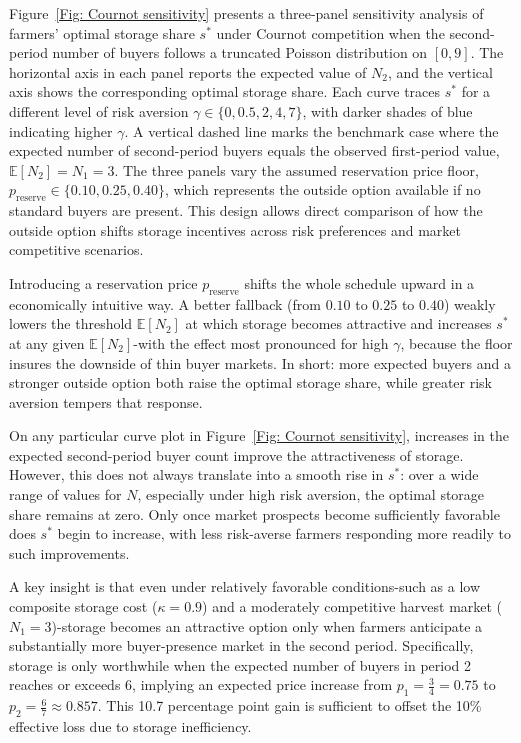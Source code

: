 Figure~\ref{Fig: Cournot sensitivity} presents a three-panel sensitivity analysis of farmers' optimal storage share $s^*$ under Cournot competition when the second-period number of buyers follows a truncated Poisson distribution on $[0,9]$. The horizontal axis in each panel reports the expected value of $N_2$, and the vertical axis shows the corresponding optimal storage share. Each curve traces $s^*$ for a different level of risk aversion $\gamma \in \{0,0.5,2,4,7\}$, with darker shades of blue indicating higher $\gamma$. A vertical dashed line marks the benchmark case where the expected number of second-period buyers equals the observed first-period value, $\mathbb{E}[N_2]=N_1=3$. The three panels vary the assumed reservation price floor, $p_{\mathrm{reserve}} \in \{0.10,0.25,0.40\}$, which represents the outside option available if no standard buyers are present. This design allows direct comparison of how the outside option shifts storage incentives across risk preferences and market competitive scenarios.

Introducing a reservation price $p_{\text{reserve}}$ shifts the whole schedule upward in a economically intuitive way. A better fallback (from $0.10$ to $0.25$ to $0.40$) weakly lowers the threshold $\mathbb{E}[N_2]$ at which storage becomes attractive and increases $s^*$ at any given $\mathbb{E}[N_2]$-with the effect most pronounced for high $\gamma$, because the floor insures the downside of thin buyer markets. In short: more expected buyers and a stronger outside option both raise the optimal storage share, while greater risk aversion tempers that response.

On any particular curve plot in Figure~\ref{Fig: Cournot sensitivity}, increases in the expected second-period buyer count improve the attractiveness of storage. However, this does not always translate into a smooth rise in $s^*$: over a wide range of values for $N$, especially under high risk aversion, the optimal storage share remains at zero. Only once market prospects become sufficiently favorable does $s^*$ begin to increase, with less risk-averse farmers responding more readily to such improvements.


A key insight is that even under relatively favorable conditions-such as a low composite storage cost ($\kappa = 0.9$) and a moderately competitive harvest market ($N_1 = 3$)-storage becomes an attractive option only when farmers anticipate a substantially more buyer-presence market in the second period. Specifically, storage is only worthwhile when the expected number of buyers in period 2 reaches or exceeds 6, implying an expected price increase from $p_1 = \frac{3}{4} = 0.75$ to $p_2 = \frac{6}{7} \approx 0.857$. This 10.7 percentage point gain is sufficient to offset the 10\% effective loss due to storage inefficiency.


